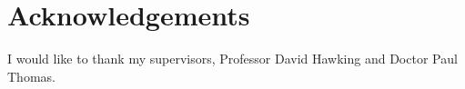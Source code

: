 \chapter*{Acknowledgements}

I would like to thank my supervisors, Professor David Hawking and Doctor Paul Thomas.
